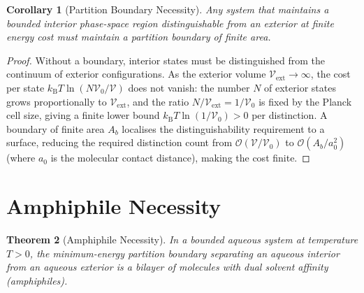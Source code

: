 \documentclass[11pt,twocolumn,a4paper]{article}
\newtheorem{theorem}{Theorem}[section]
\newtheorem{corollary}[theorem]{Corollary}
\theoremstyle{definition}
\theoremstyle{remark}
\newcommand{\kB}{k_{\mathrm{B}}}
\begin{document}
\begin{corollary}[Partition Boundary Necessity]
\label{cor:boundary}
Any system that maintains a bounded interior phase-space region distinguishable
from an exterior at finite energy cost must maintain a partition boundary
of finite area.
\end{corollary}

\begin{proof}
Without a boundary, interior states must be distinguished from the continuum of
exterior configurations. As the exterior volume $\mathcal{V}_{\text{ext}}
\to \infty$, the cost per state $\kB T \ln(N\mathcal{V}_0 / \mathcal{V})$
does not vanish: the number $N$ of exterior states grows proportionally to
$\mathcal{V}_{\text{ext}}$, and the ratio $N/\mathcal{V}_{\text{ext}} =
1/\mathcal{V}_0$ is fixed by the Planck cell size, giving a finite lower bound
$\kB T \ln(1/\mathcal{V}_0) > 0$ per distinction. A boundary of finite area
$A_b$ localises the distinguishability requirement to a surface, reducing
the required distinction count from $\mathcal{O}(\mathcal{V}/\mathcal{V}_0)$
to $\mathcal{O}(A_b/a_0^2)$ (where $a_0$ is the molecular contact distance),
making the cost finite.
\end{proof}

\section{Amphiphile Necessity}
\label{sec:amphiphile}

\begin{theorem}[Amphiphile Necessity]
\label{thm:amphiphile}
In a bounded aqueous system at temperature $T > 0$, the minimum-energy
partition boundary separating an aqueous interior from an aqueous exterior is
a bilayer of molecules with dual solvent affinity (amphiphiles).
\end{theorem}
\end{document}

